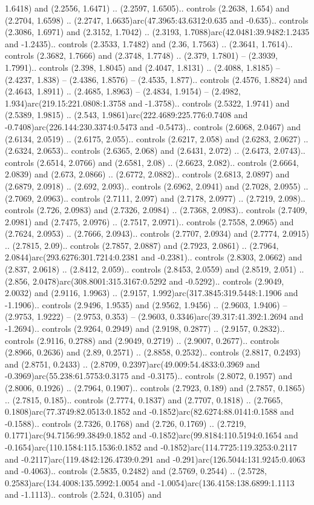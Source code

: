 1.6418) and (2.2556, 1.6471) .. (2.2597, 1.6505).. controls (2.2638, 1.654) and (2.2704, 1.6598) .. (2.2747, 1.6635)arc(47.3965:43.6312:0.635 and -0.635).. controls (2.3086, 1.6971) and (2.3152, 1.7042) .. (2.3193, 1.7088)arc(42.0481:39.9482:1.2435 and -1.2435).. controls (2.3533, 1.7482) and (2.36, 1.7563) .. (2.3641, 1.7614).. controls (2.3682, 1.7666) and (2.3748, 1.7748) .. (2.379, 1.7801) -- (2.3939, 1.7991).. controls (2.398, 1.8045) and (2.4047, 1.8131) .. (2.4088, 1.8185) -- (2.4237, 1.838) -- (2.4386, 1.8576) -- (2.4535, 1.877).. controls (2.4576, 1.8824) and (2.4643, 1.8911) .. (2.4685, 1.8963) -- (2.4834, 1.9154) -- (2.4982, 1.934)arc(219.15:221.0808:1.3758 and -1.3758).. controls (2.5322, 1.9741) and (2.5389, 1.9815) .. (2.543, 1.9861)arc(222.4689:225.776:0.7408 and -0.7408)arc(226.144:230.3374:0.5473 and -0.5473).. controls (2.6068, 2.0467) and (2.6134, 2.0519) .. (2.6175, 2.055).. controls (2.6217, 2.058) and (2.6283, 2.0627) .. (2.6324, 2.0653).. controls (2.6365, 2.068) and (2.6431, 2.072) .. (2.6473, 2.0743).. controls (2.6514, 2.0766) and (2.6581, 2.08) .. (2.6623, 2.082).. controls (2.6664, 2.0839) and (2.673, 2.0866) .. (2.6772, 2.0882).. controls (2.6813, 2.0897) and (2.6879, 2.0918) .. (2.692, 2.093).. controls (2.6962, 2.0941) and (2.7028, 2.0955) .. (2.7069, 2.0963).. controls (2.7111, 2.097) and (2.7178, 2.0977) .. (2.7219, 2.098).. controls (2.726, 2.0983) and (2.7326, 2.0984) .. (2.7368, 2.0983).. controls (2.7409, 2.0981) and (2.7475, 2.0976) .. (2.7517, 2.0971).. controls (2.7558, 2.0965) and (2.7624, 2.0953) .. (2.7666, 2.0943).. controls (2.7707, 2.0934) and (2.7774, 2.0915) .. (2.7815, 2.09).. controls (2.7857, 2.0887) and (2.7923, 2.0861) .. (2.7964, 2.0844)arc(293.6276:301.7214:0.2381 and -0.2381).. controls (2.8303, 2.0662) and (2.837, 2.0618) .. (2.8412, 2.059).. controls (2.8453, 2.0559) and (2.8519, 2.051) .. (2.856, 2.0478)arc(308.8001:315.3167:0.5292 and -0.5292).. controls (2.9049, 2.0032) and (2.9116, 1.9963) .. (2.9157, 1.992)arc(317.3845:319.5448:1.1906 and -1.1906).. controls (2.9496, 1.9535) and (2.9562, 1.9456) .. (2.9603, 1.9406) -- (2.9753, 1.9222) -- (2.9753, 0.353) -- (2.9603, 0.3346)arc(39.317:41.392:1.2694 and -1.2694).. controls (2.9264, 0.2949) and (2.9198, 0.2877) .. (2.9157, 0.2832).. controls (2.9116, 0.2788) and (2.9049, 0.2719) .. (2.9007, 0.2677).. controls (2.8966, 0.2636) and (2.89, 0.2571) .. (2.8858, 0.2532).. controls (2.8817, 0.2493) and (2.8751, 0.2433) .. (2.8709, 0.2397)arc(49.009:54.4833:0.3969 and -0.3969)arc(55.238:61.5753:0.3175 and -0.3175).. controls (2.8072, 0.1957) and (2.8006, 0.1926) .. (2.7964, 0.1907).. controls (2.7923, 0.189) and (2.7857, 0.1865) .. (2.7815, 0.185).. controls (2.7774, 0.1837) and (2.7707, 0.1818) .. (2.7665, 0.1808)arc(77.3749:82.0513:0.1852 and -0.1852)arc(82.6274:88.0141:0.1588 and -0.1588).. controls (2.7326, 0.1768) and (2.726, 0.1769) .. (2.7219, 0.1771)arc(94.7156:99.3849:0.1852 and -0.1852)arc(99.8184:110.5194:0.1654 and -0.1654)arc(110.1584:115.1536:0.1852 and -0.1852)arc(114.7725:119.3253:0.2117 and -0.2117)arc(119.4842:126.4739:0.291 and -0.291)arc(126.5044:131.9245:0.4063 and -0.4063).. controls (2.5835, 0.2482) and (2.5769, 0.2544) .. (2.5728, 0.2583)arc(134.4008:135.5992:1.0054 and -1.0054)arc(136.4158:138.6899:1.1113 and -1.1113).. controls (2.524, 0.3105) and 